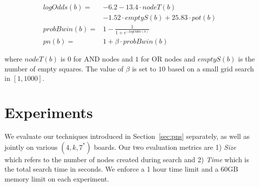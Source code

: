 \documentclass[conference]{IEEEtran}
\theoremstyle{definition}
\begin{document}
\begin{align*} 
logOdds(b) = & -6.2 - 13.4 \cdot nodeT(b) \\
& - 1.52 \cdot emptyS(b) + 25.83 \cdot pot(b) \\
probBwin(b) = & 1- \frac{1}{1+e^{-logOdds(b)}} \\
pn(b) = & 1 + \beta \cdot probBwin(b)
\end{align*}

\noindent where $nodeT(b)$ is $0$ for AND nodes and $1$ for OR nodes and $emptyS(b)$ is the number of empty squares. The value of $\beta$ is set to $10$ based on a small grid search in $[1, 1000]$. 


\section{Experiments}
\label{sec:experiments}

We evaluate our techniques introduced in Section~\ref{sec:pns} separately, as well as jointly on various $(4,k,7^*)$ boards. Our two evaluation metrics are 1) \emph{Size} which refers to the number of nodes created during search and 2) \emph{Time} which is the total search time in seconds. We enforce a 1 hour time limit and a 60GB memory limit on each experiment. 
\end{document}
